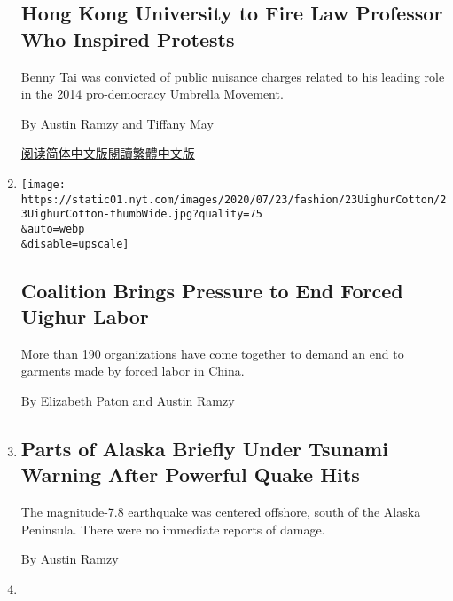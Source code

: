 \begin{enumerate}
{  \subsection{Hong Kong University to Fire Law Professor Who Inspired
  Protests}\label{hong-kong-university-to-fire-law-professor-who-inspired-protests}}

  Benny Tai was convicted of public nuisance charges related to his
  leading role in the 2014 pro-democracy Umbrella Movement.

  By Austin Ramzy and Tiffany May

  \href{https://cn.nytimes.com/china/20200729/benny-tai-hong-kong-university/}{阅读简体中文版}\href{https://cn.nytimes.com/china/20200729/benny-tai-hong-kong-university/zh-hant}{閱讀繁體中文版}
\item
  \href{/2020/07/23/fashion/uighur-forced-labor-cotton-fashion.html}{}

  \texttt{[image: https://static01.nyt.com/images/2020/07/23/fashion/23UighurCotton/23UighurCotton-thumbWide.jpg?quality=75\\\&auto=webp\\\&disable=upscale]}

  \hypertarget{coalition-brings-pressure-to-end-forced-uighur-labor}{%
  \subsection{Coalition Brings Pressure to End Forced Uighur
  Labor}\label{coalition-brings-pressure-to-end-forced-uighur-labor}}

  More than 190 organizations have come together to demand an end to
  garments made by forced labor in China.

  By Elizabeth Paton and Austin Ramzy
\item
  \href{/2020/07/22/us/alaska-earthquake-tsunami-warning.html}{}

  \hypertarget{parts-of-alaska-briefly-under-tsunami-warning-after-powerful-quake-hits}{%
  \subsection{Parts of Alaska Briefly Under Tsunami Warning After
  Powerful Quake
  Hits}\label{parts-of-alaska-briefly-under-tsunami-warning-after-powerful-quake-hits}}

  The magnitude-7.8 earthquake was centered offshore, south of the
  Alaska Peninsula. There were no immediate reports of damage.

  By Austin Ramzy
\item
  \href{/2020/07/13/world/asia/hong-kong-elections-security.html}{}


\end{enumerate}
